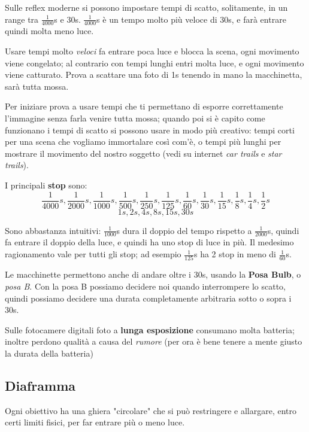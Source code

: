 Sulle reflex moderne si possono impostare tempi di scatto, solitamente, in un range tra $\frac{1}{4000}$s e 30s.\newline
$\frac{1}{4000}$s è un tempo molto più veloce di 30s, e farà entrare quindi molta meno luce.

Usare tempi molto \textit{veloci} fa entrare poca luce e blocca la scena, ogni movimento viene congelato; al contrario con tempi lunghi entri molta luce, e ogni movimento viene catturato. Prova a scattare una foto di 1s tenendo in mano la macchinetta, sarà tutta mossa.

Per iniziare prova a usare tempi che ti permettano di esporre correttamente l'immagine senza farla venire tutta mossa; quando poi si è capito come funzionano i tempi di scatto si possono usare in modo più creativo: tempi corti per una scena che vogliamo immortalare così com'è, o tempi più lunghi per mostrare il movimento del nostro soggetto (vedi su internet \textit{car trails} e \textit{star trails}).

I principali \textbf{stop} sono:
\[ \frac{1}{4000}s, \frac{1}{2000}s, \frac{1}{1000}s, \frac{1}{500}s, \frac{1}{250}s, \frac{1}{125}s, \frac{1}{60}s, \frac{1}{30}s, \frac{1}{15}s, \frac{1}{8}s, \frac{1}{4}s, \frac{1}{2}s \]
\[ 1s, 2s, 4s, 8s, 15s, 30s \]

Sono abbastanza intuitivi: $\frac{1}{1000}$s dura il doppio del tempo rispetto a $\frac{1}{2000}$s, quindi fa entrare il doppio della luce, e quindi ha uno stop di luce in più.\newline
Il medesimo ragionamento vale per tutti gli stop; ad esempio $\frac{1}{125}$s ha 2 stop in meno di $\frac{1}{60}$s.

Le macchinette permettono anche di andare oltre i 30s, usando la \textbf{Posa Bulb}, o \textit{posa B}.
Con la posa B possiamo decidere noi quando interrompere lo scatto, quindi possiamo decidere una durata completamente arbitraria sotto o sopra i 30s.

\nb Sulle fotocamere digitali foto a \textbf{lunga esposizione} consumano molta batteria; inoltre perdono qualità a causa del \textit{rumore} (per ora è bene tenere a mente giusto la durata della batteria)


\subsection{Diaframma} \label{subsec:diaframma}
Ogni obiettivo ha una ghiera "circolare" che si può restringere e allargare, entro certi
limiti fisici, per far entrare più o meno luce.

